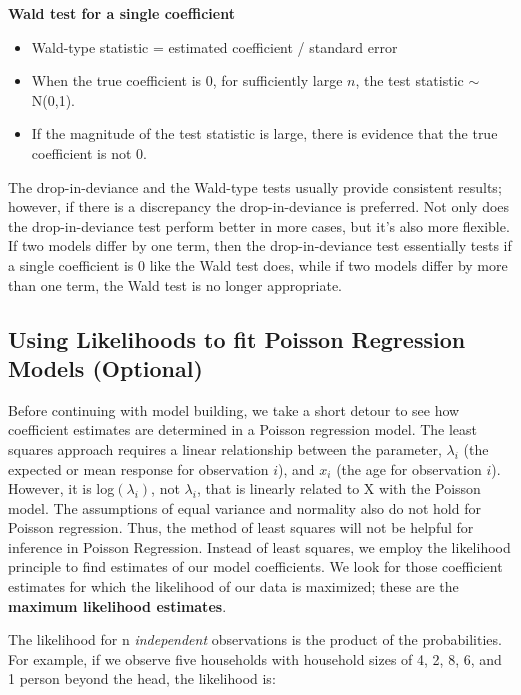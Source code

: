 \documentclass[
]{krantz}
\providecommand{\tightlist}{%
  \setlength{\itemsep}{0pt}\setlength{\parskip}{0pt}}
\begin{document}
\textbf{Wald test for a single coefficient} 

\begin{itemize}
\tightlist
\item
  Wald-type statistic = estimated coefficient / standard error
\item
  When the true coefficient is 0, for sufficiently large \(n\), the test statistic \(\sim\) N(0,1).
\item
  If the magnitude of the test statistic is large, there is evidence that the true coefficient is not 0.
\end{itemize}

The drop-in-deviance and the Wald-type tests usually provide consistent results; however, if there is a discrepancy the drop-in-deviance is preferred. Not only does the drop-in-deviance test perform better in more cases, but it's also more flexible. If two models differ by one term, then the drop-in-deviance test essentially tests if a single coefficient is 0 like the Wald test does, while if two models differ by more than one term, the Wald test is no longer appropriate.

\hypertarget{likelihood.sec}{%
\subsection{Using Likelihoods to fit Poisson Regression Models (Optional)}\label{likelihood.sec}}

Before continuing with model building, we take a short detour to see how coefficient estimates are determined in a Poisson regression model. The least squares approach requires a linear relationship between the parameter, \(\lambda_i\) (the expected or mean response for observation \(i\)), and \(x_i\) (the age for observation \(i\)). However, it is log\((\lambda_i)\), not \(\lambda_i\), that is linearly related to X with the Poisson model. The assumptions of equal variance and normality also do not hold for Poisson regression. Thus, the method of least squares will not be helpful for inference in Poisson Regression. Instead of least squares, we employ the likelihood  principle to find estimates of our model coefficients. We look for those coefficient estimates for which the likelihood of our data is maximized; these are the \textbf{maximum likelihood estimates}. 

The likelihood for n \emph{independent}  observations is the product of the probabilities. For example, if we observe five households with household sizes of 4, 2, 8, 6, and 1 person beyond the head, the likelihood is:
\end{document}
